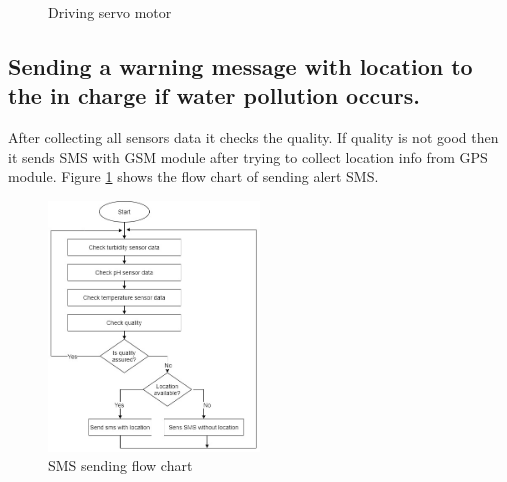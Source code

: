 \begin{figure}[H]
\centering
{} 
\hspace{2cm}
\caption{Driving servo motor}
\end{figure}
\subsection{Sending a warning message with location to the in charge   if water pollution occurs.
}
After collecting all sensors data it checks the quality. If quality is not good then it sends SMS with GSM module after trying to collect location info from GPS module.  Figure \ref{smsflow1} shows the flow chart of sending alert SMS.
\begin{figure}[H]
\centering
\includegraphics[width=0.5\textwidth]{figures/flow chart of sendibg sms.jpg}
\caption{SMS sending flow chart}
\label{smsflow1}
\end{figure}

